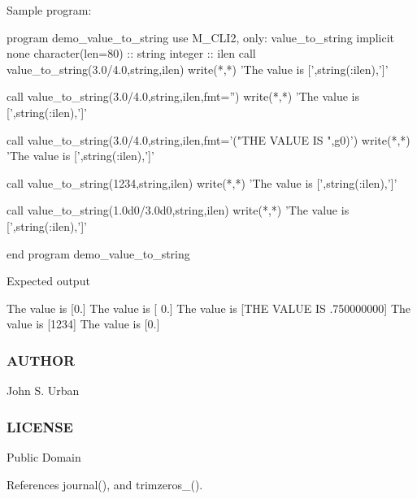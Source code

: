 Sample program\+: \begin{DoxyVerb} program demo_value_to_string
 use M_CLI2, only: value_to_string
 implicit none
 character(len=80) :: string
 integer           :: ilen
    call value_to_string(3.0/4.0,string,ilen)
    write(*,*) 'The value is [',string(:ilen),']'

    call value_to_string(3.0/4.0,string,ilen,fmt='')
    write(*,*) 'The value is [',string(:ilen),']'

    call value_to_string(3.0/4.0,string,ilen,fmt='("THE VALUE IS ",g0)')
    write(*,*) 'The value is [',string(:ilen),']'

    call value_to_string(1234,string,ilen)
    write(*,*) 'The value is [',string(:ilen),']'

    call value_to_string(1.0d0/3.0d0,string,ilen)
    write(*,*) 'The value is [',string(:ilen),']'

 end program demo_value_to_string
\end{DoxyVerb}


Expected output

The value is \mbox{[}0.\mbox{]} The value is \mbox{[} 0.\mbox{]} The value is \mbox{[}T\+HE V\+A\+L\+UE IS .750000000\mbox{]} The value is \mbox{[}1234\mbox{]} The value is \mbox{[}0.\mbox{]}

\subsubsection*{A\+U\+T\+H\+OR}

John S. Urban \subsubsection*{L\+I\+C\+E\+N\+SE}

Public Domain 

References journal(), and trimzeros\+\_\+().

